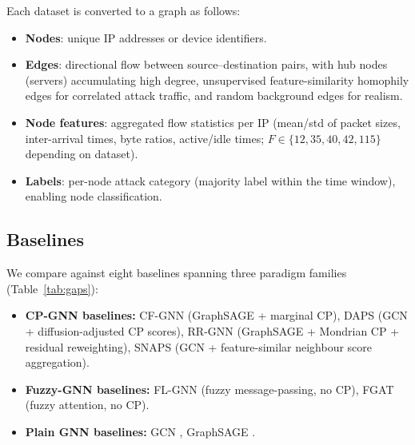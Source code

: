 Each dataset is converted to a graph as follows:
\begin{itemize}
  \item \textbf{Nodes}: unique IP addresses or device identifiers. 
  \item \textbf{Edges}: directional flow between source–destination pairs,
        with hub nodes (servers) accumulating high degree,
        unsupervised feature-similarity homophily edges for correlated attack traffic,
        and random background edges for realism. 
  \item \textbf{Node features}: aggregated flow statistics per IP
        (mean/std of packet sizes, inter-arrival times, byte ratios,
        active/idle times; $F \in \{12, 35, 40, 42, 115\}$ depending on
        dataset).
  \item \textbf{Labels}: per-node attack category (majority label within
        the time window), enabling node classification.
\end{itemize}

\subsection{Baselines}
\label{sec:baselines}

We compare against eight baselines spanning three paradigm families
(Table~\ref{tab:gaps}):

\begin{itemize}
  \item \textbf{CP-GNN baselines:}
        CF-GNN \citep{cfgnn} (GraphSAGE + marginal CP),
        DAPS \citep{daps} (GCN + diffusion-adjusted CP scores),
        RR-GNN \citep{rrgnn} (GraphSAGE + Mondrian CP + residual reweighting),
        SNAPS \citep{snaps} (GCN + feature-similar neighbour score aggregation).
  \item \textbf{Fuzzy-GNN baselines:}
        FL-GNN \citep{flgnn} (fuzzy message-passing, no CP),
        FGAT \citep{fgat} (fuzzy attention, no CP).
  \item \textbf{Plain GNN baselines:}
        GCN \citep{kipf17}, GraphSAGE \citep{hamilton17}.
\end{itemize}

